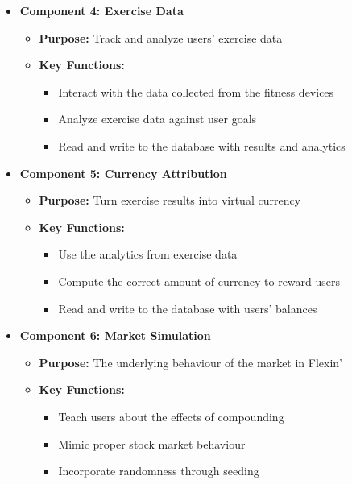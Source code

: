 \documentclass{article}
\begin{document}
\begin{itemize}
\begin{itemize}
\begin{itemize}
        \end{itemize}
    \end{itemize}
    \item \textbf{Component 4: Exercise Data}
    \begin{itemize}
        \item \textbf{Purpose:} Track and analyze users' exercise data
        \item \textbf{Key Functions:}
        \begin{itemize}
            \item Interact with the data collected from the fitness devices
            \item Analyze exercise data against user goals
            \item Read and write to the database with results and analytics
        \end{itemize}
    \end{itemize}
    \item \textbf{Component 5: Currency Attribution}
    \begin{itemize}
        \item \textbf{Purpose:} Turn exercise results into virtual currency
        \item \textbf{Key Functions:}
        \begin{itemize}
            \item Use the analytics from exercise data
            \item Compute the correct amount of currency to reward users
            \item Read and write to the database with users' balances
        \end{itemize}
    \end{itemize}
    \item \textbf{Component 6: Market Simulation}
    \begin{itemize}
        \item \textbf{Purpose:} The underlying behaviour of the market in Flexin'
        \item \textbf{Key Functions:}
        \begin{itemize}
            \item Teach users about the effects of compounding
            \item Mimic proper stock market behaviour
            \item Incorporate randomness through seeding
        \end{itemize}
    \end{itemize}

\end{itemize}
\end{document}
